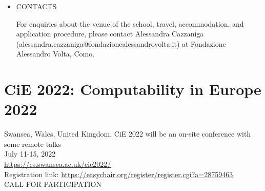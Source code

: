 \documentclass[prodmode,acmtecs]{acmsmall} %
\begin{document}
\begin{itemize}
\item  CONTACTS 
 
  For enquiries about the venue of the school, travel, accommodation, and application procedure, please contact Alessandra Cazzaniga (alessandra.cazzaniga@fondazionealessandrovolta.it) at Fondazione Alessandro Volta, Como.  
 
\end{itemize}\section{CiE 2022: Computability in Europe 2022}\label{CiE2022}  Swansea, Wales, United Kingdom, CiE 2022 will be an on-site conference with some remote talks\\ 
  July 11-15, 2022\\ 
  \href{https://cs.swansea.ac.uk/cie2022/}{https://cs.swansea.ac.uk/cie2022/}\\ 
  Registration link: \href{https://easychair.org/register/register.cgi?a=28759463}{https://easychair.org/register/register.cgi?a=28759463}\\ 
CALL FOR PARTICIPATION 
\end{document}
